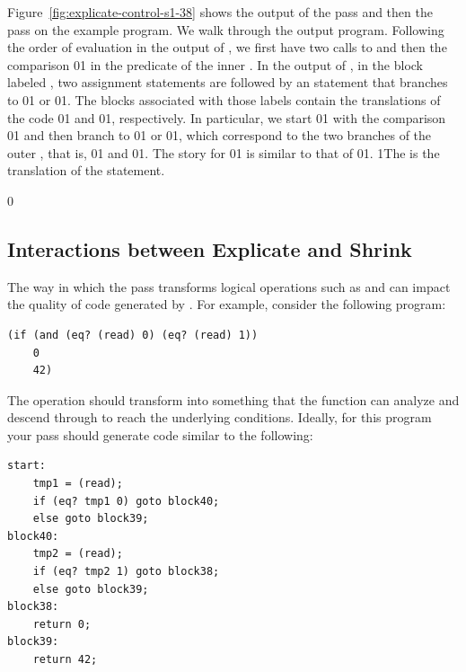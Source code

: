 \documentclass[7x10]{TimesAPriori_MIT}%
\def\racketEd{0}
\def\pythonEd{1}
\providecommand{\BookEdition}{1}
\let\edition\BookEdition
\newcommand{\racket}[1]{{\if\edition\racketEd{#1}\fi}}
\newcommand{\pythonColor}[0]{}
\newcommand{\python}[1]{{\if\edition\pythonEd\pythonColor #1\fi}}
\numberwithin{theorem}{chapter}
\numberwithin{definition}{chapter}
\numberwithin{equation}{chapter}
\begin{document}
Figure~\ref{fig:explicate-control-s1-38} shows the output of the
 pass and then the
 pass on the example program. We walk through
the output program.
%
Following the order of evaluation in the output of
, we first have two calls to \CREAD{}
and then the comparison \racket{}\python{}
in the predicate of the inner .  In the output of
, in the
block labeled , two assignment statements are followed by an
 statement that branches to \racket{}\python{}
or \racket{}\python{}.
The blocks associated with those labels contain the
translations of the code
\racket{}\python{}
and
\racket{}\python{},
respectively.  In particular, we start
\racket{}\python{}
with the comparison
\racket{}\python{}
and then branch to \racket{}\python{}
or \racket{}\python{},
which correspond to the two branches of the outer , that is,
\racket{}\python{} and
\racket{}\python{}.
%
The story for \racket{}\python{}
is similar to that of \racket{}\python{}.
%
\python{The  is the translation of the \code{print} statement.}


{\if\edition\racketEd

\subsection{Interactions between Explicate and Shrink}
  
The way in which the  pass transforms logical operations
such as  and  can impact the quality of code
generated by . For example, consider the
following program:
\begin{lstlisting}
(if (and (eq? (read) 0) (eq? (read) 1))
    0
    42)  
\end{lstlisting}
The  operation should transform into something that the
 function can analyze and descend through to
reach the underlying  conditions. Ideally, for this program
your  pass should generate code similar to
the following:
\begin{center}
\begin{minipage}{\textwidth}
\begin{lstlisting}
start:
    tmp1 = (read);
    if (eq? tmp1 0) goto block40;
    else goto block39;
block40:
    tmp2 = (read);
    if (eq? tmp2 1) goto block38;
    else goto block39;
block38:
    return 0;
block39:
    return 42;
\end{lstlisting}
\end{minipage}
\end{center}
\fi}
\end{document}
